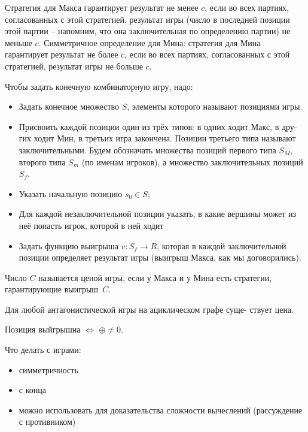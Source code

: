 \documentclass{article}
\newcommand{\lra}{\Leftrightarrow}
\newcommand*{\xor}{\mathbin{\oplus}}
\newenvironment{theorem}[2][Теорема]{\begin{trivlist}
\item[\hskip \labelsep {\bfseries #1}\hskip \labelsep {\bfseries #2.}]}{\end{trivlist}}
\newenvironment{definition}[2][Определение]{\begin{trivlist}
\item[\hskip \labelsep {\bfseries #1}\hskip \labelsep {\bfseries #2}]}{\end{trivlist}}
\begin{document}
\begin{definition}{Согласованность.}
Стратегия для Макса гарантирует результат не менее $c$, если
во всех партиях, согласованных $с$ этой стратегией, результат игры (число в последней позиции этой партии -- напомним, что она заключительная по определению
партии) не меньше $c$. Симметричное определение для Мина: стратегия для Мина
гарантирует результат не более $c$, если во всех партиях, согласованных $с$ этой
стратегией, результат игры не больше $c$.
\end{definition}
\begin{definition}{Конечная комб игра}
Чтобы задать конечную комбинаторную игру, надо:
\begin{itemize}
\item Задать конечное множество $S$, элементы которого называют позициями игры.
\item Присвоить каждой позиции один из трёх типов: в одних ходит Макс, в дру-
гих ходит Мин, в третьих игра закончена. Позиции третьего типа называют
заключительными. Будем обозначать множества позиций первого типа $S_M$,
второго типа $S_m$ (по именам игроков), а множество заключительных позиций
$S_f$.
\item Указать начальную позицию $s_0 \in S$;
\item Для каждой незаключительной позиции указать, в какие вершины может из
неё попасть игрок, которой в ней ходит
\item Задать функцию выигрыша $v : S_f \to R$, которая в каждой заключительной
позиции определяет результат игры (выигрыш Макса, как мы договорились).
\end{itemize}
\end{definition}

\begin{definition}{Цена игры.}
Число $C$ называется ценой игры, если у Макса и у Мина есть
стратегии, гарантирующие выигрыш~$C$.
\end{definition}

\begin{theorem}{Существование цены.}
Для любой антагонистической игры на ациклическом графе суще-
ствует цена.
\end{theorem}

\begin{theorem}{Ним}
Позиция выйгрышна $\lra$ $\xor \neq 0$. 
\end{theorem}

Что делать с играми:
\begin{itemize}
    \item симметричность
    \item с конца
    \item можно использовать для доказательства сложности вычеслений (рассуждение с противником)
\end{itemize}
\end{document}
